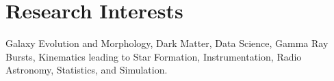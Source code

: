 \documentclass[a4paper,10pt]{article} %
\begin{document}

\section{Research Interests}

Galaxy Evolution and Morphology, Dark Matter, Data Science, Gamma Ray Bursts,  Kinematics leading to Star Formation, Instrumentation, Radio Astronomy, Statistics, and Simulation.



\newpage

\end{document}
